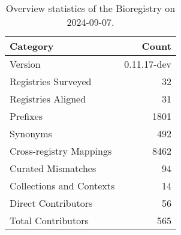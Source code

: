 \begin{table}
\caption{Overview statistics of the Bioregistry on 2024-09-07.}
\label{tab:bioregistry-summary}
\begin{tabular}{lr}
\toprule
Category & Count \\
\midrule
Version & 0.11.17-dev \\
Registries Surveyed & 32 \\
Registries Aligned & 31 \\
Prefixes & 1801 \\
Synonyms & 492 \\
Cross-registry Mappings & 8462 \\
Curated Mismatches & 94 \\
Collections and Contexts & 14 \\
Direct Contributors & 56 \\
Total Contributors & 565 \\
\bottomrule
\end{tabular}
\end{table}
